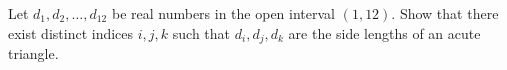 Let $d_1, d_2, \dots, d_{12}$ be real numbers in the open
interval $(1, 12)$. Show that there exist distinct indices $i, j, k$
such that $d_i, d_j, d_k$ are the side lengths of an acute triangle.
